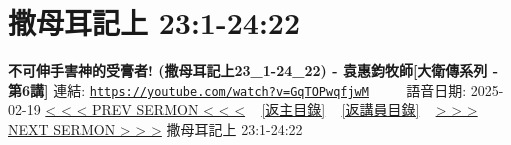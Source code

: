 \documentclass{book}
\begin{document}
\section{撒母耳記上 23:1-24:22}
\label{sec:GqTOPwqfjwM}
\textbf{不可伸手害神的受膏者! (撒母耳記上23\_1-24\_22) - 袁惠鈞牧師[大衛傳系列 - 第6講]}
\newline
\newline
連結: \href{https://youtube.com/watch?v=GqTOPwqfjwM}{\texttt{https://youtube.com/watch?v=GqTOPwqfjwM}} ~~~~ 語音日期: 2025-02-19
\newline
\newline
\hyperref[sec:WCt7vYrgwVY]{< < < PREV SERMON < < <}
~
\hyperlink{toc}{[返主目錄]}
~
\hyperref[ch:preacher12]{[返講員目錄]}
~
\hyperref[sec:86NlAlqZbEc]{> > > NEXT SERMON > > >}
\newline
\newline
撒母耳記上 23:1-24:22
\newline
\end{document}
